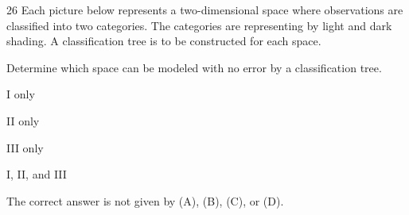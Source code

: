 \begin{question}{26}
Each picture below represents a two-dimensional space where observations are classified into two categories. The categories are representing by light and dark shading. A classification tree is to be constructed for each space.

Determine which space can be modeled with no error by a classification tree.
\begin{statements}
\item {}
\item {}
\item {}
\end{statements}

\begin{choices}
\item I only
\item II only
\item III only
\item I, II, and III
\item The correct answer is not given by (A), (B), (C), or (D).
\end{choices}
\end{question}

